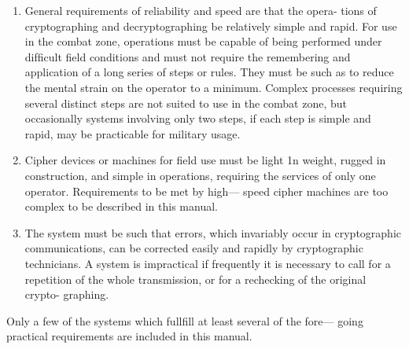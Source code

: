 \begin{enumerate}
\item General requirements of reliability and speed are that the opera-
tions of cryptographing and decryptographing be relatively
simple and rapid. For use in the combat zone, operations must
be capable of being performed under difﬁcult ﬁeld conditions
and must not require the remembering and application of a
long series of steps or rules. They must be such as to reduce
the mental strain on the operator to a minimum. Complex
processes requiring several distinct steps are not suited to use
in the combat zone, but occasionally systems involving only
two steps, if each step is simple and rapid, may be practicable
for military usage.

\item Cipher devices or machines for ﬁeld use must be light 1n weight,
rugged in construction, and simple in operations, requiring the
services of only one operator. Requirements to be met by high—
speed cipher machines are too complex to be described in this
manual.

\item The system must be such that errors, which invariably occur in
cryptographic communications, can be corrected easily and
rapidly by cryptographic technicians. A system is impractical
if frequently it is necessary to call for a repetition of the whole
transmission, or for a rechecking of the original crypto-
graphing.
\end{enumerate}

\mypara Only a few of the systems which fullfill at least several of the fore—
going practical requirements are included in this manual.
